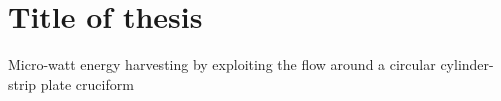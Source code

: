\documentclass[a4paper]{article}
\begin{document}
\newcommand{\uon}{\unit{0.1}{\metre\per\second}}
\newcommand{\utw}{\unit{0.2}{\metre\per\second}}
\newcommand{\uth}{\unit{0.3}{\metre\per\second}}
\newcommand{\ufo}{\unit{0.4}{\metre\per\second}}
\newcommand{\ufi}{\unit{0.5}{\metre\per\second}}
\newcommand{\usi}{\unit{0.6}{\metre\per\second}}
\newcommand{\use}{\unit{0.7}{\metre\per\second}}
\newcommand{\uei}{\unit{0.8}{\metre\per\second}}
\newcommand{\uni}{\unit{0.9}{\metre\per\second}}
\newcommand{\ute}{\unit{1.0}{\metre\per\second}}
\newcommand{\uel}{\unit{1.1}{\metre\per\second}}
\newcommand{\utv}{\unit{1.2}{\metre\per\second}}
\newcommand{\utt}{\unit{1.3}{\metre\per\second}}

\newcommand{\ptlt}{$\theta_{\text{plate}}$}
\newcommand{\rze}{\unit{0}{\radian}}
\newcommand{\ron}{\unit{\pi/8}{\radian}}
\newcommand{\rtw}{\unit{\pi/4}{\radian}}
\newcommand{\rth}{\unit{3\pi/8}{\radian}}
\newcommand{\rfo}{\unit{\pi/2}{\radian}}

\newcommand{\ypl}{$y^{+}$} %
\newcommand{\ured}{$U^{*}$} %
\newcommand{\yrms}{$y^{*}_{\text{RMS}}$} %

\newcommand{\uron}{$2.3$}
\newcommand{\urtw}{$4.5$}
\newcommand{\urth}{$6.8$}
\newcommand{\urfo}{$9.1$}
\newcommand{\urfi}{$11.4$}
\newcommand{\ursi}{$13.6$}
\newcommand{\urse}{$15.9$}
\newcommand{\urei}{$18.2$}
\newcommand{\urni}{$20.5$}
\newcommand{\urte}{$22.7$}
\newcommand{\urel}{$25.0$}
\newcommand{\urtv}{$27.3$}
\newcommand{\urtt}{$29.5$}

\newcommand{\es}{$=$}
\newcommand{\flrms}{$F_{\text{L,RMS}}$} %
\newcommand{\cflyt}{$C_{F_{L},y(t)}$} %
\newcommand{\cflm}{$C_{F_{L},\text{max}}$} %
\newcommand{\fn}{$f_{n}$} %
\newcommand{\afl}{$\alpha_{F_{L}}$} %
\section{Title of thesis}
Micro-watt energy harvesting by exploiting the flow around a circular cylinder-strip plate cruciform
\end{document}

